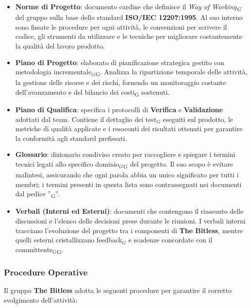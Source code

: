 \documentclass[a4paper, 10pt]{article}
\begin{document}
\begin{itemize}
    \item \textbf{Norme di Progetto}: documento cardine che definisce il \textit{Way of Working\textsubscript{G}} del gruppo sulla base dello standard \textbf{ISO/IEC 12207:1995}. Al suo interno sono fissate le procedure per ogni attività, le convenzioni per scrivere il codice, gli strumenti da utilizzare e le tecniche per migliorare costantemente la qualità del lavoro prodotto.

    \item \textbf{Piano di Progetto}: elaborato di pianificazione strategica gestito con metodologia incrementale$_G$\textsubscript{G}. Analizza la ripartizione temporale delle attività, la gestione delle risorse e dei rischi, fornendo un monitoraggio costante dell'avanzamento e del bilancio dei costi\textsubscript{G} sostenuti.

    \item \textbf{Piano di Qualifica}: specifica i protocolli di \textbf{Verifica} e \textbf{Validazione} adottati dal team. Contiene il dettaglio dei test$_G$ eseguiti sul prodotto, le metriche di qualità applicate e i resoconti dei risultati ottenuti per garantire la conformità agli standard prefissati.

    \item \textbf{Glossario}: dizionario condiviso creato per raccogliere e spiegare i termini tecnici legati allo specifico dominio$_G$\textsubscript{G} del progetto. Il suo scopo è evitare malintesi, assicurando che ogni parola abbia un unico significato per tutti i membri; i termini presenti in questa lista sono contrassegnati nei documenti dal pedice ''\textsubscript{G}''.

    \item \textbf{Verbali (Interni ed Esterni)}: documenti che contengono il riassunto delle discussioni e l'elenco delle decisioni prese durante le riunioni. I verbali interni tracciano l'evoluzione del progetto tra i componenti di \textbf{The Bitless}, mentre quelli esterni cristallizzano feedback$_G$ e scadenze concordate con il committente$_G$\textsubscript{G}.
\end{itemize}

\subsubsection{Procedure Operative}
Il gruppo \textbf{The Bitless} adotta le seguenti procedure per garantire il corretto svolgimento dell'attività:
\end{document}
